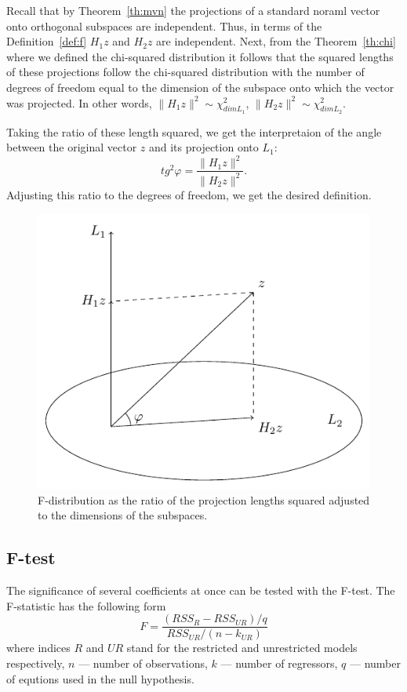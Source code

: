 
Recall that by Theorem~\ref{th:mvn} the projections of a standard noraml vector
onto orthogonal subspaces are independent.
Thus, in terms of the Definition~\ref{def:f} $H_1 z$ and $H_2 z$ are independent.
Next, from the Theorem~\ref{th:chi} where we defined the chi-squared distribution
it follows that the squared lengths of these projections follow
the chi-squared distribution with the number of degrees of freedom
equal to the dimension of the subspace onto which the vector was projected.
In other words, $\lVert H_1 z \rVert^2 \sim \chi^2_{dim L_1}$,
$\lVert H_2 z \rVert^2 \sim \chi^2_{dim L_2}$.

Taking the ratio of these length squared, we get the interpretaion
of the angle between the original vector $z$ and its projection onto $L_1$:
\[
tg^2 \varphi = \frac{\lVert H_1 z \rVert^2}{\lVert H_2 z \rVert^2}.
\]
Adjusting this ratio to the degrees of freedom, we get the desired definition.

\begin{figure}
\centering
\includegraphics[width=0.55\linewidth]{figures/04_f_dist_example.pdf}
\caption{F-distribution as the ratio of the projection lengths squared
adjusted to the dimensions of the subspaces.}
\label{fig:f_dist}
\end{figure}


\subsection{F-test}

The significance of several coefficients at once can be tested with the F-test.
The F-statistic has the following form
\[
F = \frac{(RSS_{R} - RSS_{UR})/q}{RSS_{UR}/(n-k_{UR})}
\]
where indices $R$ and $UR$ stand for the restricted and unrestricted models
respectively, $n$ — number of observations, $k$ — number of regressors,
$q$ — number of equtions used in the null hypothesis.

